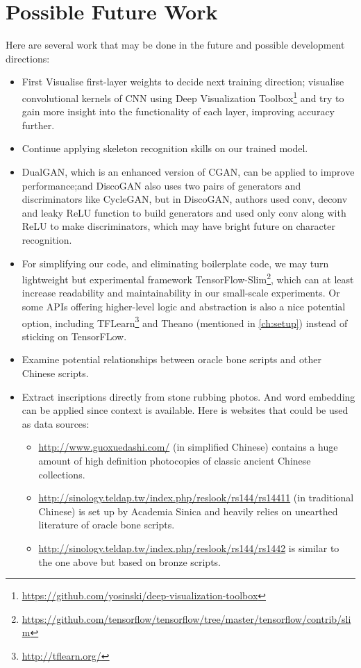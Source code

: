 \chapter{Possible Future Work}
Here are several work that may be done in the future and possible development directions:
\begin{itemize}
	\item First Visualise first-layer weights to decide next training direction; visualise convolutional kernels of CNN using Deep Visualization Toolbox\footnote{\url{https://github.com/yosinski/deep-visualization-toolbox}} and try to gain more insight into the functionality of each layer, improving accuracy further.
	\item Continue applying skeleton recognition skills on our trained model.
	\item DualGAN\cite{DBLP:journals/corr/YiZTG17}, which is an enhanced version of CGAN, can be applied to improve performance;and DiscoGAN\cite{DBLP:journals/corr/KimCKLK17} also uses two pairs of generators and discriminators like CycleGAN, but in DiscoGAN, authors used conv, deconv and leaky ReLU function to build generators and used only conv along with ReLU to make discriminators, which may have bright future on character recognition.
	\item For simplifying our code, and eliminating boilerplate code, we may turn lightweight but experimental framework TensorFlow-Slim\footnote{\url{https://github.com/tensorflow/tensorflow/tree/master/tensorflow/contrib/slim}}, which can at least increase readability and maintainability in our small-scale experiments. Or some APIs offering higher-level logic and abstraction is also a nice potential option, including TFLearn\footnote{\url{http://tflearn.org/}} and Theano (mentioned in \ref{ch:setup}) instead of sticking on TensorFLow.
	\item Examine potential relationships between oracle bone scripts and other Chinese scripts.
	\item Extract inscriptions directly from stone rubbing photos. And word embedding can be applied since context is available. Here is websites that could be used as data sources:
	\begin{itemize}
		\item \url{http://www.guoxuedashi.com/} (in simplified Chinese) contains a huge amount of high definition photocopies of classic ancient Chinese collections.
		\item \url{http://sinology.teldap.tw/index.php/reslook/rs144/rs14411} (in traditional Chinese) is set up by Academia Sinica and heavily relies on unearthed literature of oracle bone scripts.
		\item \url{http://sinology.teldap.tw/index.php/reslook/rs144/rs1442} is similar to the one above but based on bronze scripts.
	\end{itemize}
\end{itemize}